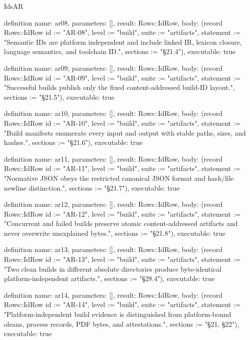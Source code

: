 \begin{lexlean}{IdsAR}
\begin{semanticmodule}
definition{
  name: ar08,
  parameters: [],
  result: Rows::IdRow,
  body: (record Rows::IdRow {id := "AR-08", level := "build", suite := "artifacts", statement := "Semantic IDs are platform independent and include linked IR, lexicon closure, language semantics, and toolchain ID.", sections := "§21.4"}),
  executable: true
}

definition{
  name: ar09,
  parameters: [],
  result: Rows::IdRow,
  body: (record Rows::IdRow {id := "AR-09", level := "build", suite := "artifacts", statement := "Successful builds publish only the fixed content-addressed build-ID layout.", sections := "§21.5"}),
  executable: true
}

definition{
  name: ar10,
  parameters: [],
  result: Rows::IdRow,
  body: (record Rows::IdRow {id := "AR-10", level := "build", suite := "artifacts", statement := "Build manifests enumerate every input and output with stable paths, sizes, and hashes.", sections := "§21.6"}),
  executable: true
}

definition{
  name: ar11,
  parameters: [],
  result: Rows::IdRow,
  body: (record Rows::IdRow {id := "AR-11", level := "build", suite := "artifacts", statement := "Normative JSON obeys the restricted canonical JSON format and hash/file newline distinction.", sections := "§21.7"}),
  executable: true
}

definition{
  name: ar12,
  parameters: [],
  result: Rows::IdRow,
  body: (record Rows::IdRow {id := "AR-12", level := "build", suite := "artifacts", statement := "Concurrent and failed builds preserve atomic content-addressed artifacts and never overwrite unexplained bytes.", sections := "§21.8"}),
  executable: true
}

definition{
  name: ar13,
  parameters: [],
  result: Rows::IdRow,
  body: (record Rows::IdRow {id := "AR-13", level := "build", suite := "artifacts", statement := "Two clean builds in different absolute directories produce byte-identical platform-independent artifacts.", sections := "§28.4"}),
  executable: true
}

definition{
  name: ar14,
  parameters: [],
  result: Rows::IdRow,
  body: (record Rows::IdRow {id := "AR-14", level := "build", suite := "artifacts", statement := "Platform-independent build evidence is distinguished from platform-bound oleans, process records, PDF bytes, and attestations.", sections := "§21, §22"}),
  executable: true
}
\end{semanticmodule}
\end{lexlean}
